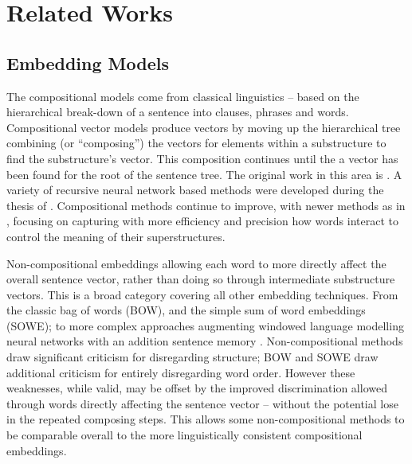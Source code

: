 \documentclass[11pt]{article}
\theoremstyle{plain}
\theoremstyle{definition}
\begin{document}
\section{Related Works}\label{relwork}
\subsection{Embedding Models}

The compositional models come from classical linguistics -- based on the hierarchical  break-down of a sentence into clauses, phrases and words. Compositional vector models produce vectors by moving up the hierarchical tree combining (or ``composing'') the vectors for elements within a substructure to find the substructure's vector. This composition continues until the a vector has been found for the root of the sentence tree. The original work in this area is \textcite{Mitchell2008}. A variety of recursive neural network based methods were developed during the thesis of \textcite{socher2014recursive}. Compositional methods continue to improve, with newer methods as in \textcite{TACL15CompVector}, focusing on capturing with more efficiency and precision how words interact to control the meaning of their superstructures. 


Non-compositional embeddings allowing each word to more directly affect the overall sentence vector, rather than doing so through intermediate substructure vectors. This is a broad category covering all other embedding techniques. From the classic bag of words (BOW), and the simple sum of word embeddings (SOWE); to more complex approaches augmenting windowed language modelling neural networks with an addition sentence memory \parencite{le2014distributed}.  Non-compositional methods draw significant criticism for disregarding structure; BOW and SOWE draw additional criticism for entirely disregarding word order. However these weaknesses, while valid, may be offset by the improved discrimination allowed through words directly affecting the sentence vector -- without the potential lose in the repeated composing steps. This allows some non-compositional methods to be comparable overall to the more linguistically consistent compositional embeddings. 
\end{document}

